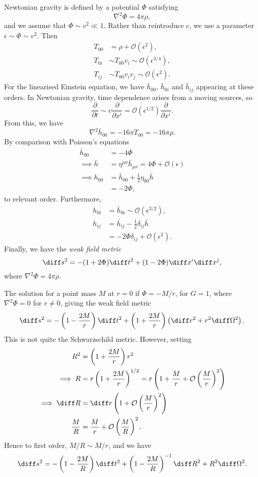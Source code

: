 \documentclass[12pt]{article}
\begin{document}
Newtonian gravity is defined by a potential $\Phi$ satisfying
\[
\nabla^2 \Phi = 4 \pi \rho,
\]
and we assume that $\Phi \sim v^2 \ll 1$. Rather than reintroduce $c$, we use a parameter $\epsilon \sim \Phi \sim v^2$. Then
\begin{align*}
	T_{00} &= \rho + \mathcal{O}(\epsilon^2), \\
	T_{0i} &\sim T_{00} v_i \sim \mathcal{O}(\epsilon^{3/4}), \\
	T_{ij} &\sim T_{00} v_i v_j \sim \mathcal{O}(\epsilon^2).
\end{align*}
For the linearised Einstein equation, we have $\bar h_{00}$, $\bar h_{0i}$ and $\bar h_{ij}$ appearing at these orders. In Newtonian gravity, time dependence arises from a moving sources, so
\[
\frac{\partial}{\partial t} \sim v \frac{\partial}{\partial x^i} = \mathcal{O}(\epsilon^{1/2}) \frac{\partial}{\partial x^i}.
\]
From this, we have
\[
\nabla^2 \bar h_{00} = -16 \pi T_{00} = -16 \pi \rho.
\]
By comparison with Poisson's equations
\begin{align*}
	\bar h_{00} &= - 4 \Phi \\
	\implies \bar h &= \eta^{\mu\nu} \bar h_{\mu\nu} = 4 \Phi + \mathcal{O}(\epsilon) \\
	\implies h_{00} &= \bar h_{00} + \frac{1}{2} \eta_{00} \bar h \\
			&= - 2 \Phi,
\end{align*}
to relevant order. Furthermore,
\begin{align*}
	h_{0i} &= \bar h_{0i} \sim \mathcal{O}(\epsilon^{3/2}), \\
	h_{ij} &= \bar h_{ij} - \frac{1}{2} \delta_{ij} \bar h \\
	       &= - 2 \Phi \delta_{ij} + \mathcal{O}(\epsilon^2).
\end{align*}
Finally, we have the \emph{weak field metric}
\[
\diff s^2 = - (1 + 2 \Phi)\diff t^2 + (1 - 2 \Phi)\diff x^i \diff x^j,
\]
where $\nabla^2 \Phi = 4 \pi \rho$.

The solution for a point mass $M$ at $r = 0$ if $\Phi = -M/r$, for $G = 1$, where $\nabla^2 \Phi = 0$ for $r \neq 0$, giving the weak field metric
\[
\diff s^2 = - \left(1 - \frac{2M}{r} \right)\diff t^2 + \left(1 + \frac{2M}{r} \right)\left( \diff r^2 + r^2 \diff \Omega^2 \right).
\]
This is not quite the Schwarzschild metric. However, setting
\begin{align*}
	R^2 &= \left(1 + \frac{2M}{r} \right)r^2 \\
	\implies R &= r \left(1 + \frac{2M}{r} \right)^{1/2} = r \left(1 + \frac{M}{r} + \mathcal{O}\left( \frac{M}{r} \right)^2 \right) \\
	\implies \diff R &= \diff r \left(1 + \mathcal{O}\left( \frac{M}{r} \right)^2 \right) \\
	\frac{M}{R} &= \frac{M}{r} + \mathcal{O} \left( \frac{M}{R}\right)^2.
\end{align*}
Hence to first order, $M/R \sim M/r$, and we have
\[
\diff s^2 = - \left( 1 - \frac{2M}{R} \right) \diff t^2 + \left(1 - \frac{2M}{R} \right)^{-1} \diff R^2 + R^2 \diff \Omega^2.
\]
\end{document}
